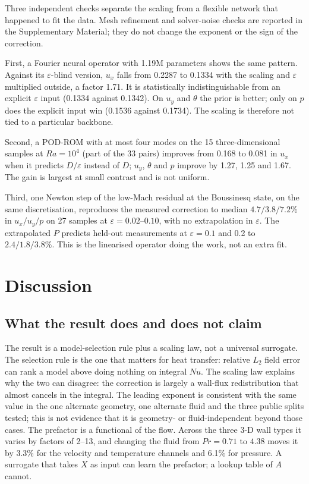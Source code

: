 \documentclass[preprint,11pt,a4paper,times]{elsarticle}
\begin{document}
Three independent checks separate the scaling from a flexible network that happened to
fit the data.
\label{sec:noise}
Mesh refinement and solver-noise checks are reported in the Supplementary Material; they do not
change the exponent or the sign of the correction.

First, a Fourier neural operator with 1.19M parameters shows the same pattern. Against its
$\varepsilon$-blind version, $u_x$ falls from 0.2287 to 0.1334 with the scaling and
$\varepsilon$ multiplied outside, a factor 1.71. It is statistically indistinguishable from an
explicit $\varepsilon$ input (0.1334 against 0.1342). On $u_y$ and $\theta$ the prior is
better; only on $p$ does the explicit input win (0.1536 against 0.1734). The scaling is
therefore not tied to a particular backbone.

Second, a POD-ROM with at most four modes on the 15 three-dimensional samples at $Ra=10^4$
(part of the 33 pairs) improves from 0.168 to 0.081 in $u_x$ when it predicts
$D/\varepsilon$ instead of $D$; $u_y$, $\theta$ and $p$ improve by 1.27, 1.25 and 1.67. The
gain is largest at small contrast and is not uniform.

Third, one Newton step of the low-Mach residual at the Boussinesq state, on the same
discretisation, reproduces the measured correction to median $4.7/3.8/7.2\%$ in
$u_x/u_y/p$ on 27 samples at $\varepsilon=0.02$--$0.10$, with no extrapolation in
$\varepsilon$. The extrapolated $P$ predicts held-out measurements at $\varepsilon=0.1$ and
0.2 to $2.4/1.8/3.8\%$. This is the linearised operator doing the work, not an extra fit.

\section{Discussion}
\label{sec:discussion}

\subsection{What the result does and does not claim}

The result is a model-selection rule plus a scaling law, not a universal surrogate. The
selection rule is the one that matters for heat transfer: relative $L_2$ field error can rank
a model above doing nothing on integral $Nu$. The scaling law explains why the two can
disagree: the correction is largely a wall-flux redistribution that almost cancels in the
integral. The leading exponent is consistent with the same value in the one alternate geometry,
one alternate fluid and the three public splits tested; this is not evidence that it is
geometry- or fluid-independent beyond those cases. The prefactor is a functional of the flow.
Across the three 3-D wall types it varies by factors of 2--13, and changing the fluid from
$Pr=0.71$ to $4.38$ moves it by 3.3\% for the velocity and temperature channels and 6.1\% for
pressure. A surrogate that takes $X$ as input can learn the prefactor; a lookup table of $A$
cannot.
\end{document}
